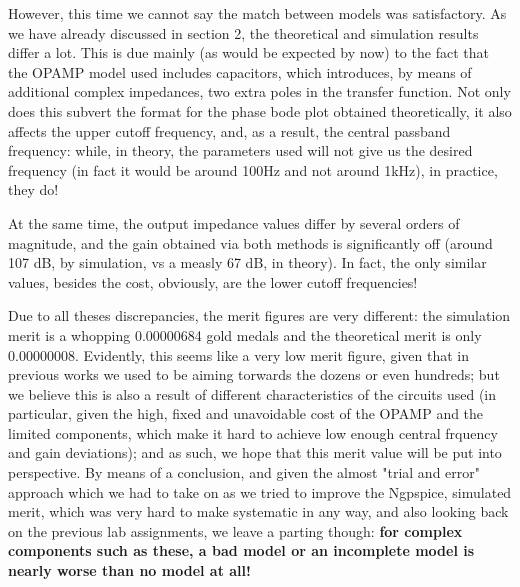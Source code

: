 However, this time we cannot say the match between models was satisfactory. As we have already discussed in section 2, the theoretical and simulation results differ a lot. This is due mainly (as would be expected by now) to the fact that the OPAMP model used includes capacitors, which introduces, by means of additional complex impedances, two extra poles in the transfer function. Not only does this subvert the format for the phase bode plot obtained theoretically, it also affects the upper cutoff frequency, and, as a result, the central passband frequency: while, in theory, the parameters used will not give us the desired frequency (in fact it would be around 100Hz and not around 1kHz), in practice, they do! \par
At the same time, the output impedance values differ by several orders of magnitude, and the gain obtained via both methods is significantly off (around 107 dB, by simulation, vs a measly 67 dB, in theory). In fact, the only similar values, besides the cost, obviously, are the lower cutoff frequencies!\par
Due to all theses discrepancies, the merit figures are very different: the simulation merit is a whopping 0.00000684 gold medals and the theoretical merit is only 0.00000008. Evidently, this seems like a very low merit figure, given that in previous works we used to be aiming torwards the dozens or even hundreds; but we believe this is also a result of different characteristics of the circuits used (in particular, given the high, fixed and unavoidable cost of the OPAMP and the limited components, which make it hard to achieve low enough central frquency and gain deviations); and as such, we hope that this merit value will be put into perspective. 
By means of a conclusion, and given the almost "trial and error" approach which we had to take on as we tried to improve the Ngpspice, simulated merit, which was very hard to make systematic in any way, and also looking back on the previous lab assignments, we leave a parting though: \textbf{for complex components such as these, a bad model or an incomplete model is nearly worse than no model at all!}\par


